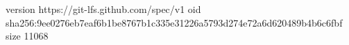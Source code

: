 version https://git-lfs.github.com/spec/v1
oid sha256:9ee0276eb7eaf6b1be8767b1c335e31226a5793d274e72a6d620489b4b6c6fbf
size 11068
